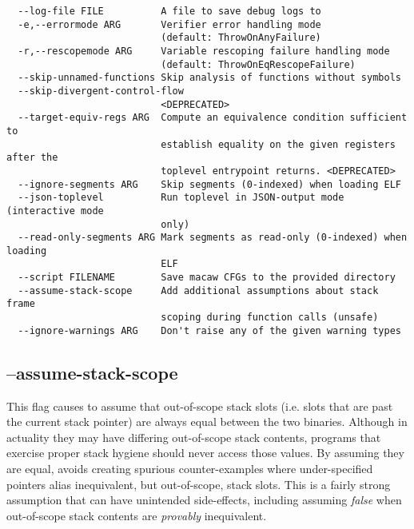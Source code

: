 \begin{verbatim}
  --log-file FILE          A file to save debug logs to
  -e,--errormode ARG       Verifier error handling mode
                           (default: ThrowOnAnyFailure)
  -r,--rescopemode ARG     Variable rescoping failure handling mode
                           (default: ThrowOnEqRescopeFailure)
  --skip-unnamed-functions Skip analysis of functions without symbols
  --skip-divergent-control-flow
                           <DEPRECATED>
  --target-equiv-regs ARG  Compute an equivalence condition sufficient to
                           establish equality on the given registers after the
                           toplevel entrypoint returns. <DEPRECATED>
  --ignore-segments ARG    Skip segments (0-indexed) when loading ELF
  --json-toplevel          Run toplevel in JSON-output mode (interactive mode
                           only)
  --read-only-segments ARG Mark segments as read-only (0-indexed) when loading
                           ELF
  --script FILENAME        Save macaw CFGs to the provided directory
  --assume-stack-scope     Add additional assumptions about stack frame 
                           scoping during function calls (unsafe)
  --ignore-warnings ARG    Don't raise any of the given warning types
\end{verbatim}

\subsection{--assume-stack-scope}

This flag causes \pate{} to assume that out-of-scope stack slots 
(i.e. slots that are past the current stack pointer) are always equal between
the two binaries.
Although in actuality they may have differing out-of-scope stack
contents, programs that exercise proper stack hygiene should never
access those values. By assuming they are equal, \pate{} avoids 
creating spurious counter-examples where under-specified pointers
alias inequivalent, but out-of-scope, stack slots.
This is a fairly strong assumption that can have unintended side-effects,
including assuming \emph{false} when out-of-scope stack contents are
\emph{provably} inequivalent.


